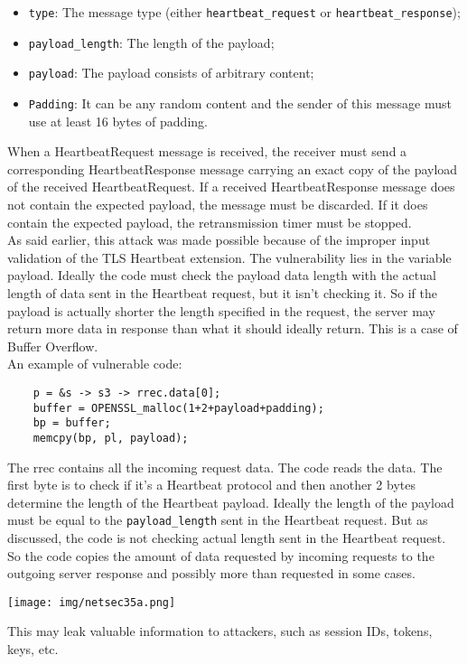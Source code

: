 \documentclass[a4paper, 10pt, titlepage]{article}
\begin{document}
\begin{itemize}
	\item \lstinline|type|: The message type (either \lstinline|heartbeat_request| or \lstinline|heartbeat_response|);
	\item \lstinline|payload_length|: The length of the payload;
	\item \lstinline|payload|: The payload consists of arbitrary content;
	\item \lstinline|Padding|: It can be any random content and the sender of this message must use at least 16 bytes of padding.
\end{itemize}
When a HeartbeatRequest message is received, the receiver must send a corresponding HeartbeatResponse message carrying an exact copy of the payload of the received HeartbeatRequest. If a received HeartbeatResponse message does not contain the expected payload, the message must be discarded. If it does contain the expected payload, the retransmission timer must be stopped. \\
As said earlier, this attack was made possible because of the improper input validation of the TLS Heartbeat extension. The vulnerability lies in the variable payload. Ideally the code must check the payload data length with the actual length of data sent in the Heartbeat request, but it isn’t checking it. So if the payload is actually shorter the length specified in the request, the server may return more data in response than what it should ideally return. This is a case of Buffer Overflow. \medskip\\
An example of vulnerable code:
\begin{lstlisting}
	p = &s -> s3 -> rrec.data[0];
	buffer = OPENSSL_malloc(1+2+payload+padding);
	bp = buffer;
	memcpy(bp, pl, payload);
\end{lstlisting}
The rrec contains all the incoming request data. The code reads the data. The first byte is to check if it’s a Heartbeat protocol and then another 2 bytes determine the length of the Heartbeat payload. Ideally the length of the payload must be equal to the \lstinline|payload_length| sent in the Heartbeat request. But as discussed, the code is not checking actual length sent in the Heartbeat request. So the code copies the amount of data requested by incoming requests to the outgoing server response and possibly more than requested in some cases.
\begin{center}
	\texttt{[image: img/netsec35a.png]}
\end{center}
This may leak valuable information to attackers, such as session IDs, tokens, keys, etc.
\end{document}
